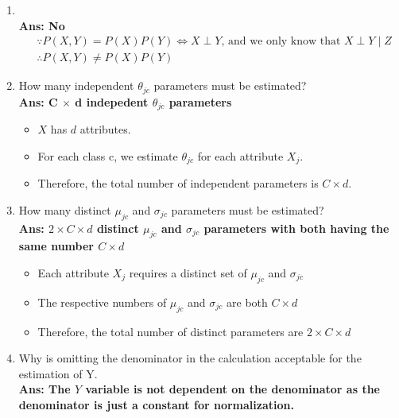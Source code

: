 \documentclass{article}
\theoremstyle{definition}
\theoremstyle{remark}
\begin{document}
\begin{enumerate}[font={\Large\bfseries},left=0pt]
\begin{tcolorbox}
\begin{enumerate}
\begin{enumerate}
				      \item {}  \\
				            \textbf{Ans: No} \\
				            \begin{align}
					             & \because P(X, Y) = P(X)P(Y) \iff X \perp Y \text{, and we only know that } X \perp Y \mid Z \\
					             & \therefore P(X, Y) \neq P(X)P(Y)
				            \end{align}

				      \item How many independent $\theta_{jc}$ parameters must be estimated? \\
				            \textbf{Ans: C $\times$ d indepedent $\theta_{jc}$ parameters}
				            \begin{itemize}
					            \item $X$ has $d$ attributes.
					            \item For each class c, we estimate $\theta_{jc}$ for each attribute $X_j$.
					            \item Therefore, the total number of independent parameters is $C \times d$.
				            \end{itemize}

				      \item How many distinct $\mu_{jc}$ and $\sigma_{jc}$ parameters must be estimated? \\
				            \textbf{Ans: $2 \times C \times d$ distinct $\mu_{jc}$ and $\sigma_{jc}$ parameters with both having the same number $C \times d$}
				            \begin{itemize}
					            \item Each attribute $X_j$ requires a distinct set of $\mu_{jc}$ and $\sigma_{jc}$
					            \item The respective numbers of $\mu_{jc}$ and $\sigma_{jc}$ are both $C \times d$
					            \item Therefore, the total number of distinct parameters are $2 \times C \times d$
				            \end{itemize}

				      \item Why is omitting the denominator in the calculation acceptable for the estimation of Y. \\
				            \textbf{Ans: The $Y$ variable is not dependent on the denominator as the denominator is just a constant for normalization.}


\end{enumerate}
\end{enumerate}
\end{tcolorbox}
\end{enumerate}
\end{document}
